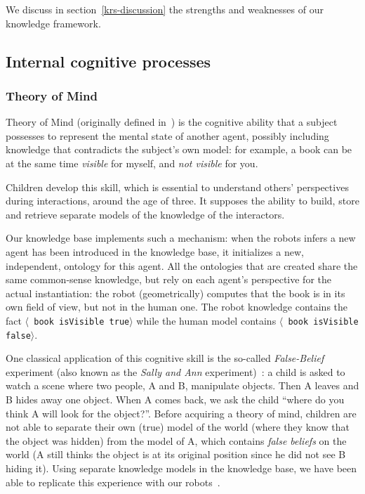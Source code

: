 \documentclass[preprint,3p,times]{elsarticle}
\newcommand{\stmt}[1]{{\footnotesize \tt $\langle$ #1\relax$\rangle$}}
\begin{document}
We discuss in section~\ref{krs-discussion} the strengths and weaknesses of our
knowledge framework.

\subsection{Internal cognitive processes}
\label{sect|intern}

\subsubsection{Theory of Mind}
\label{sect|tom}

Theory of Mind (originally defined in~\cite{Premack1978}) is the cognitive
ability that a subject possesses to represent the mental state of another
agent, possibly including knowledge that contradicts the subject's own model: for
example, a book can be at the same time \emph{visible} for myself, and \emph{not
visible} for you.

Children develop this skill, which is essential to understand others' perspectives during
interactions, around the age of three. It supposes the
ability to build, store and retrieve separate models of the knowledge of the
interactors.

Our knowledge base implements such a mechanism: when the robots infers a new
agent has been introduced in the knowledge base, it initializes a new,
independent, ontology for this agent. All the ontologies that are created share
the same common-sense knowledge, but rely on each agent's perspective for the
actual instantiation: the robot (geometrically) computes that the book is in
its own field of view, but not in the human one. The robot knowledge contains
the fact \stmt{book isVisible true} while the human model contains \stmt{book
isVisible false}.

One classical application of this cognitive skill is the so-called
\emph{False-Belief} experiment (also known as the \emph{Sally and Ann}
experiment)~\cite{Leslie2000}: a child is asked to watch a scene where two
people, A and B, manipulate objects. Then A leaves and B hides away one
object. When A comes back, we ask the child ``where do you think A will
look for the object?''. Before acquiring a theory of mind, children are not
able to separate their own (true) model of the world (where they know that
the object was hidden) from the model of A, which contains \emph{false
beliefs} on the world (A still thinks the object is at its original
position since he did not see B hiding it). Using separate knowledge models
in the knowledge base, we have been able to replicate this experience with
our robots~\cite{warnier2012when}.
\end{document}
